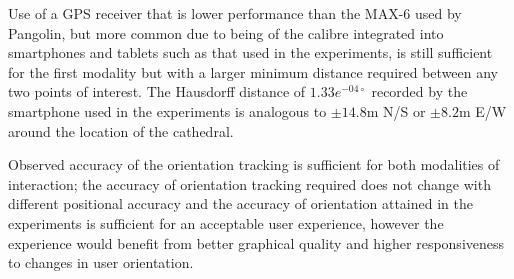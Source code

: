 Use of a GPS receiver that is lower performance than the MAX-6 used by Pangolin, but more common due to being of the calibre integrated into smartphones and tablets such as that used in the experiments, is still sufficient for the first modality but with a larger minimum distance required between any two points of interest. The Hausdorff distance of $1.33e^{-04\circ}$ recorded by the smartphone used in the experiments is analogous to $\pm14.8$m N/S or $\pm8.2$m E/W around the location of the cathedral.

Observed accuracy of the orientation tracking is sufficient for both modalities of interaction; the accuracy of orientation tracking required does not change with different positional accuracy and the accuracy of orientation attained in the experiments is sufficient for an acceptable user experience, however the experience would benefit from better graphical quality and higher responsiveness to changes in user orientation.

